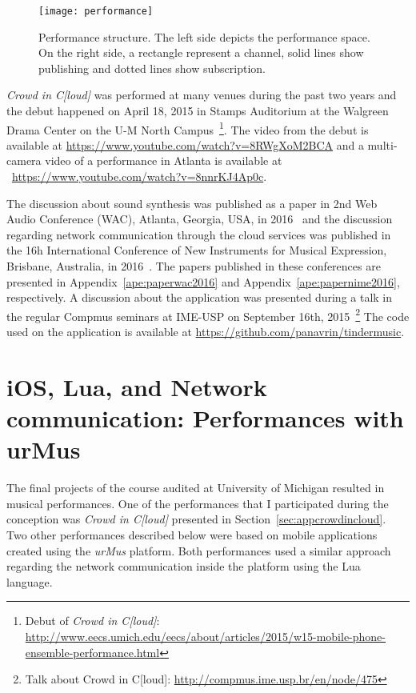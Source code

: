 \begin{figure}[t]
	\centering
	\texttt{[image: performance]}
	\caption{Performance structure. The left side depicts the performance space. On the right side, a rectangle represent a channel, solid lines show publishing and dotted lines show subscription.}
	\label{fig:performance}
\end{figure}

\textit{Crowd in C[loud]} was performed at many venues during the past two years and the debut happened on April 18, 2015 in Stamps Auditorium at the Walgreen Drama Center on the U-M North Campus~\footnote{Debut of \textit{Crowd in C[loud]}: \url{http://www.eecs.umich.edu/eecs/about/articles/2015/w15-mobile-phone-ensemble-performance.html}}.
The video from the debut is available at \url{https://www.youtube.com/watch?v=8RWgXoM2BCA} and a multi-camera video of a performance in Atlanta is available at ~\url{https://www.youtube.com/watch?v=8nnrKJ4Ap0c}.

The discussion about sound synthesis was published as a paper in 2nd Web Audio Conference (WAC), Atlanta, Georgia,  USA, in 2016~\citep{Lee2016crowd} and the discussion regarding network communication through the cloud services was published in the 16h International Conference of New Instruments for Musical Expression, Brisbane, Australia, in 2016~\citep{deCarvalhoJunior2016understanding}.
The papers published in these conferences are presented in Appendix~\ref{ape:paperwac2016} and Appendix~\ref{ape:papernime2016}, respectively.
A discussion about the application was presented during a talk in the regular Compmus seminars at IME-USP on September 16th, 2015~\footnote{Talk about Crowd in C[loud]: \url{http://compmus.ime.usp.br/en/node/475}}
The code used on the application is available at \url{https://github.com/panavrin/tindermusic}.

\section{iOS, Lua, and Network communication: Performances with urMus}
\label{sec:appsumich}

The final projects of the course audited at University of Michigan resulted in musical performances.
One of the performances that I participated during the conception was \textit{Crowd in C[loud]} presented in Section~\ref{sec:appcrowdincloud}.
Two other performances described below were based on mobile applications created using the \textit{urMus} platform.
Both performances used a similar approach regarding the network communication inside the platform using the Lua language.

